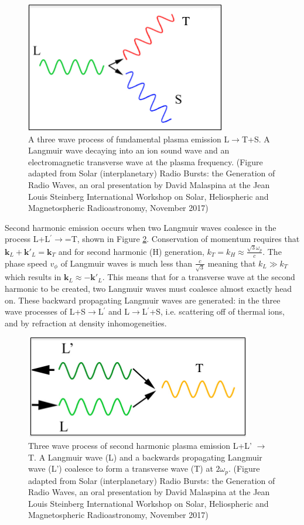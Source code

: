 \begin{figure}[ht]
\centering
\includegraphics[width=0.5\columnwidth]{Images/Fundamental_emission_Lwaves.png}
\caption[A three wave process of fundamental plasma emission L$\rightarrow$T+S]{A three wave process of fundamental plasma emission L$\rightarrow$T+S. A Langmuir wave decaying into an ion sound wave and an electromagnetic transverse wave at the plasma frequency. (Figure adapted from Solar (interplanetary) Radio Bursts: the Generation of Radio Waves,	an oral presentation by David Malaspina at the Jean Louis Steinberg International Workshop on Solar, Heliospheric and Magnetospheric Radioastronomy, November 2017)}
\label{fig:Femission}
\end{figure}

Second harmonic emission occurs when two Langmuir waves coalesce in the process L+L$^\prime \rightarrow$=T, shown in Figure \ref{fig:Hemission}. Conservation of momentum requires that $\mathbf{k}_L + \mathbf{k'}_L = \mathbf{k}_T$ and for second harmonic (H) generation, $k_T=k_H \approx \frac{\sqrt{3} \omega_p}{c}$. The phase speed $v_\phi$ of Langmuir waves is much less than $\frac{c}{\sqrt{3}}$ meaning that $k_L \gg k_T$ which results in $\mathbf{k}_L \approx -\mathbf{k'}_L$. This means that for a transverse wave at the second harmonic to be created, two Langmuir waves must coalesce almost exactly head on. These backward propagating Langmuir waves are generated: in the three wave processes of L+S$\rightarrow$L$^\prime$ and L$\rightarrow$L$^\prime$+S, i.e. scattering off of thermal ions, and by refraction at density inhomogeneities.
 \begin{figure}[ht]

     \centering
     \includegraphics[width=0.5\columnwidth]{Images/Harmonic_emission_Lwaves.png}
     \caption[Three wave process of second harmonic plasma emission L+L' $\rightarrow$ T]{Three wave process of second harmonic plasma emission L+L' $\rightarrow$ T. A Langmuir wave (L) and a backwards propagating Langmuir wave (L') coalesce to form a transverse wave (T) at $2 \omega_p$. (Figure adapted from Solar (interplanetary) Radio Bursts: the Generation of Radio Waves,	an oral presentation by David Malaspina at the Jean Louis Steinberg International Workshop on Solar, Heliospheric and Magnetospheric Radioastronomy, November 2017)}
     \label{fig:Hemission}
 \end{figure}
 
